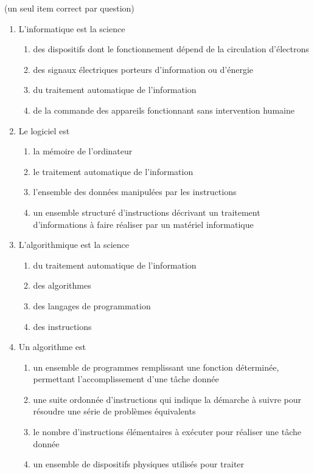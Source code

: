 \begin{td}[QCM (1)]\label{td:qcmIntro}
(un seul item correct par question)
\begin{enumerate}
\item L'informatique est la science
	\begin{enumerate}
	\item des dispositifs dont le fonctionnement dépend de 
		la circulation d'électrons
	\item des signaux électriques porteurs d'information ou d'énergie
	\item du traitement automatique de l'information
	\item de la commande des appareils fonctionnant sans intervention humaine
	\end{enumerate}
\item Le logiciel est
	\begin{enumerate}
	\item la mémoire de l'ordinateur
	\item le traitement automatique de l'information
	\item l'ensemble des données manipulées par les instructions
	\item un ensemble structuré d'instructions décrivant un traitement d'informations
		à faire réaliser par un matériel informatique
	\end{enumerate}
\item L'algorithmique est la science
	\begin{enumerate}
	\item du traitement automatique de l'information
	\item des algorithmes
	\item des langages de programmation
	\item des instructions
	\end{enumerate}
\item Un algorithme est
	\begin{enumerate}
	\item un ensemble de programmes remplissant une fonction déterminée,
		permettant l'accom\-plis\-se\-ment d'une tâche donnée
	\item une suite ordonnée d'instructions qui indique la démarche 
		à suivre pour résoudre une série de problèmes équivalents
	\item le nombre d'instructions élémentaires à exécuter pour
		réaliser une tâche donnée
	\item un ensemble de dispositifs physiques utilisés pour traiter

\end{enumerate}
\end{enumerate}
\end{td}
